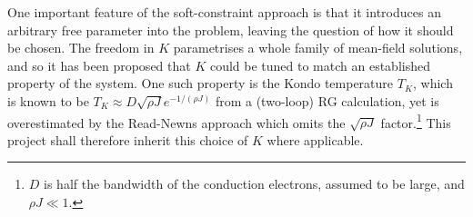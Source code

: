 One important feature of the soft-constraint approach is that it introduces an arbitrary free parameter into the problem, leaving the question of how it should be chosen. The freedom in $ K $ parametrises a whole family of mean-field solutions, and so it has been proposed that $ K $ could be tuned to match an established property of the system. One such property is the Kondo temperature $ T_K $, which is known to be $ T_K \approx D \sqrt{\rho J} e^{- 1 / (\rho J)} $ from a (two-loop) RG calculation, yet is overestimated by the Read-Newns approach which omits the $ \sqrt{\rho J} $ factor.\footnote{$ D $ is half the bandwidth of the conduction electrons, assumed to be large, and $ \rho J \ll 1 $.} This project shall therefore inherit this choice of $ K $ where applicable.

